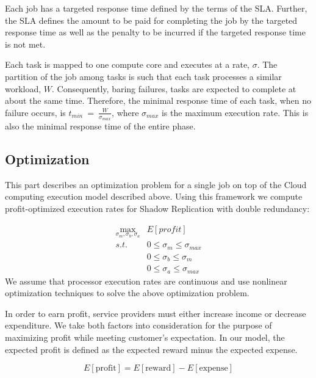 Each job has a targeted response time defined
by the terms of the SLA. Further, the SLA defines the amount to be
paid for completing the job by the targeted response time as well as
the penalty to be incurred if the targeted response time is not
met. 

Each task is mapped to one compute core and executes at a rate, $\sigma$. The partition of the job among tasks is
such that each task processes a similar
workload, $W$. Consequently, baring failures, tasks are expected to
complete at about the same time. Therefore, the minimal response time
of each task, when no failure occurs, is
$t_{min}~=~\frac{W}{\sigma_{max}}$, where $\sigma_{max}$ is the maximum execution rate. This is also the minimal response
time of the entire phase. 


\subsection{Optimization}
This part describes an optimization problem for a single job on top of the Cloud computing execution model described above. Using this
framework we compute profit-optimized execution rates for Shadow Replication with double redundancy: 

\begin{equation}
\label{optimization_problem}
\begin{alignedat}{2}
\max_{\sigma_m,\sigma_b,\sigma_a}     & E[profit] \\
s.t.                                 & 0 \leq \sigma_m \leq \sigma_{max} \\
                                     & 0 \leq \sigma_b \leq \sigma_{m} \\
                                     & 0 \leq \sigma_a \leq \sigma_{max} 
\end{alignedat}
\end{equation}
We assume that processor execution 
rates are continuous and use nonlinear optimization techniques
to solve the above optimization problem. 

In order to earn profit, service providers must either increase
income or decrease expenditure. We take both factors into
consideration for the purpose of maximizing profit while meeting
customer's expectation. In our model, the expected profit is defined as the expected reward minus the expected expense.

\begin{equation}
E[\text{profit}]=E[\text{reward}]-E[\text{expense}]
\end{equation}

